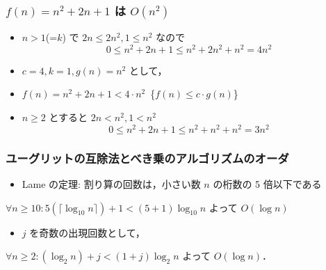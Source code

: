 \begin{frame}[shrink]
\frametitle{\(f(n)=n^2+2n+1\) は \(O(n^2)\)}
  \begin{itemize}
\item \(n>1\)(=\(k\)) で \(2n\leq 2n^2, 1\leq n^2\) なので
    \begin{displaymath}
0\leq n^2+2n+1\leq n^2+2n^2+n^2= 4n^2
    \end{displaymath}
\item \(c=4, k=1, g(n)=n^2\) として，
\item \(f(n)=n^2+2n+1<4\cdot n^2\)\ \textemdash\{\(f(n)\leq c\cdot g(n)\)\}
\item \(n\geq 2\) とすると \(2n<n^2, 1<n^2\) 
    \begin{displaymath}
0\leq n^2+2n+1\leq n^2+n^2+n^2= 3n^2
    \end{displaymath}
  \end{itemize}
\end{frame}
\begin{frame}[shrink]
\frametitle{ユーグリットの互除法とべき乗のアルゴリズムのオーダ}
  \begin{example}[ユーグリットの互除法]
    \begin{itemize}
\item Lame の定理: 割り算の回数は，小さい数 $n$ の桁数の 5 倍以下である
    \end{itemize}
\(\forall n\ge 10:5(\lceil\log_{10}n\rceil)+1<(5+1)\log_{10} n\) よって \(O(\log n)\)
  \end{example}
  \begin{example}[べき乗]
    \begin{itemize}
\item $j$ を奇数の出現回数として，
    \end{itemize}
\(\forall n\ge2:(\log_2 n)+j<(1+j)\log_2 n\) よって \(O(\log n)\)．
  \end{example}
\end{frame}
